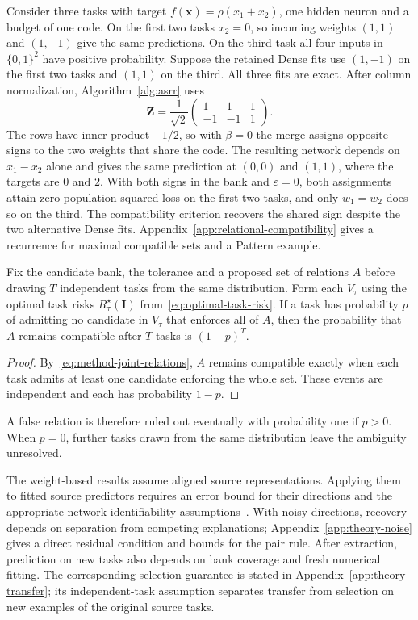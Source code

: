 Consider three tasks with target
$f(\mathbf x)=\rho(x_1+x_2)$, one hidden neuron and a budget of one
code. On the first two tasks $x_2=0$, so incoming weights $(1,1)$ and
$(1,-1)$ give the same predictions. On the third task all four inputs
in $\{0,1\}^2$ have positive probability. Suppose the retained Dense
fits use $(1,-1)$ on the first two tasks and $(1,1)$ on the third.
All three fits are exact. After column normalization, Algorithm~\ref{alg:asrr}
uses
\[
    \mathbf Z=\frac{1}{\sqrt{2}}
    \begin{pmatrix}
        1&1&1\\
        -1&-1&1
    \end{pmatrix}.
\]
The rows have inner product $-1/2$, so with $\beta=0$ the merge assigns
opposite signs to the two weights that share the code. The resulting network
depends on $x_1-x_2$ alone and gives the same prediction at $(0,0)$
and $(1,1)$, where the
targets are $0$ and $2$. With both signs in the bank and $\varepsilon=0$,
both assignments attain zero population squared loss on the first two
tasks, and only $w_1=w_2$ does so on the third. The compatibility
criterion recovers the shared sign despite the two alternative
Dense fits. Appendix~\ref{app:relational-compatibility} gives a
recurrence for maximal compatible sets and a Pattern example.

\begin{proposition}
    \label{prop:theory-distinguishing-task}
    Fix the candidate bank, the tolerance and a proposed set of
    relations $A$ before drawing $T$ independent tasks from the same
    distribution. Form each $V_\tau$ using the optimal task risks
    $R_\tau^\star(\mathbf I)$ from~\eqref{eq:optimal-task-risk}.
    If a task has probability $p$ of admitting no candidate in $V_\tau$
    that enforces all of $A$, then the probability that $A$ remains
    compatible after $T$ tasks is $(1-p)^T$.
\end{proposition}

\begin{proof}
    By~\eqref{eq:method-joint-relations}, $A$ remains compatible
    exactly when each task admits at least one candidate enforcing
    the whole set. These events are independent and each has
    probability $1-p$.
\end{proof}

A false relation is therefore ruled out eventually with probability
one if $p>0$. When $p=0$, further tasks drawn from the same
distribution leave the ambiguity unresolved.

The weight-based results assume aligned source representations.
Applying them to fitted source predictors requires an error bound
for their directions and the appropriate network-identifiability
assumptions~\cite{stock2022embedding}.
With noisy directions, recovery depends on separation from competing
explanations; Appendix~\ref{app:theory-noise} gives a direct residual
condition and bounds for the pair rule.
After extraction, prediction on new tasks also depends on bank
coverage and fresh numerical fitting. The corresponding selection
guarantee is stated in Appendix~\ref{app:theory-transfer}; its
independent-task assumption separates transfer from selection on
new examples of the original source tasks.
